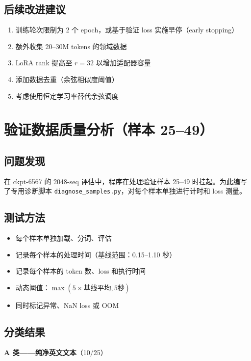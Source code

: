 \documentclass[12pt,a4paper]{ctexart}
\begin{document}
\subsection{后续改进建议}

\begin{enumerate}[nosep]
    \item 训练轮次限制为 2 个 epoch，或基于验证 loss 实施早停（early stopping）
    \item 额外收集 20--30M tokens 的领域数据
    \item LoRA rank 提高至 $r = 32$ 以增加适配器容量
    \item 添加数据去重（余弦相似度阈值）
    \item 考虑使用恒定学习率替代余弦调度
\end{enumerate}

\section{验证数据质量分析（样本 25--49）}

\subsection{问题发现}

在 ckpt-6567 的 2048-seq 评估中，程序在处理验证样本 25--49 时挂起。为此编写了专用诊断脚本 \texttt{diagnose\_samples.py}，对每个样本单独进行计时和 loss 测量。

\subsection{测试方法}

\begin{itemize}[nosep]
    \item 每个样本单独加载、分词、评估
    \item 记录每个样本的处理时间（基线范围：0.15--1.10 秒）
    \item 记录每个样本的 token 数、loss 和执行时间
    \item 动态阈值：$\max(5 \times \text{基线平均}, 5\text{秒})$
    \item 同时标记异常、NaN loss 或 OOM
\end{itemize}

\subsection{分类结果}

\textbf{A 类——纯净英文文本}（10/25）
\end{document}
